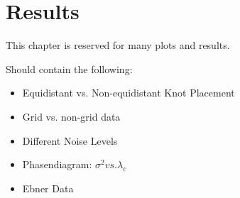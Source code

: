 


\chapter{Results}

This chapter is reserved for many plots and results.

Should contain the following: 

\begin{itemize}
	\item Equidistant vs. Non-equidistant Knot Placement
	\item Grid vs. non-grid data
	\item Different Noise Levels
	\item Phasendiagram: $\sigma^2 vs. \lambda_c$
	\item Ebner Data
\end{itemize}

